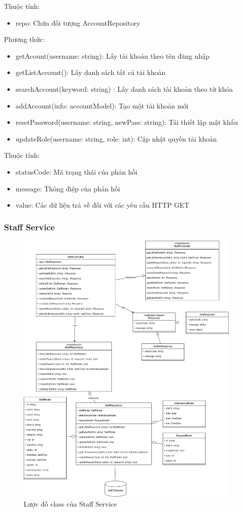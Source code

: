 Thuộc tính:
\begin{itemize}
	\item repo: Chứa đối tượng AccountRepository
\end{itemize}
Phương thức:
\begin{itemize}
	\item getAcount(username: string): Lấy tài khoản theo tên đăng nhập
	\item getListAccount(): Lấy danh sách tất cả tài khoản
	\item searchAccount(keyword: string) : Lấy danh sách tài khoản theo từ khóa
	\item addAccount(info: accountModel): Tạo một tài khoản mới
	\item resetPassword(username: string, newPass: string): Tái thiết lập mật khẩu	
	\item updateRole(username: string, role: int): Cập nhật quyền tài khoản
\end{itemize}


Thuộc tính:
\begin{itemize}
	\item statusCode: Mã trạng thái của phản hồi
	\item message: Thông điệp của phản hồi
	\item value: Các dữ liệu trả về đối với các yêu cầu HTTP GET
\end{itemize}




\subsubsection{Staff Service}
\begin{figure}[!htp]
	\centering
	\includegraphics[width=11cm]{img/Architecture/service/StaffService.png}
	\newline
	\caption{Lược đồ class của Staff Service}
\end{figure}

